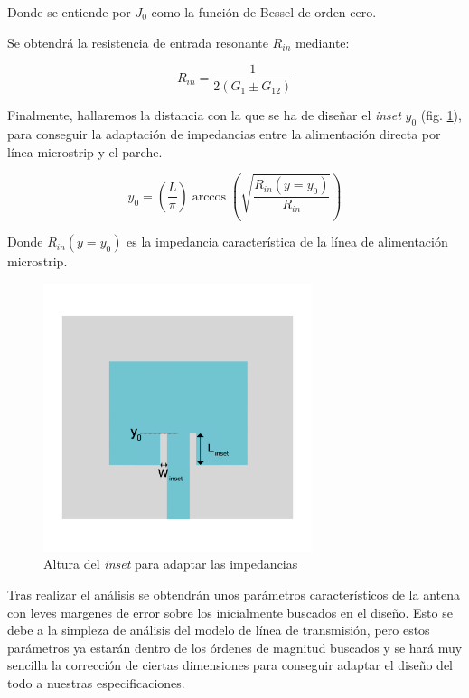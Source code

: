 Donde se entiende por \textit{$J_{0}$} como la función de Bessel de orden cero.
\\
\par Se obtendrá la resistencia de entrada resonante \textit{$R_{in}$} mediante:

\begin{equation}
	R_{in}=\frac{1}{2(G_{1}\pm G_{12})}
	\label{eq:rin}
\end{equation}

\par Finalmente, hallaremos la distancia con la que se ha de diseñar el  \textit{inset} \textit{$y_{0}$} (fig. \ref{fig:inset}),  para conseguir la adaptación de impedancias entre la alimentación directa por línea microstrip y el parche.

\begin{equation}
	y_{0}=\left ( \frac{L}{\pi} \right )\arccos\left ( \sqrt{\frac{R_{in}(y=y_{0})}{R_{in}}} \right )
	\label{eq:yo}
\end{equation}

Donde \textit{$R_{in}(y=y_{0})$} es la impedancia característica de la línea de alimentación microstrip.

\begin{figure}[h]
    \centering
        \includegraphics[width=0.7\textwidth]{archivos/parche/inset}
        \caption{Altura del \textit{inset} para adaptar las impedancias}
        \label{fig:inset}
\end{figure}

\par Tras realizar el análisis se obtendrán unos parámetros característicos de la antena con leves margenes de error sobre los inicialmente buscados en el diseño. Esto se debe a la simpleza de análisis del modelo de línea de transmisión, pero estos parámetros ya estarán dentro de los órdenes de magnitud buscados y se hará muy sencilla la corrección de ciertas dimensiones para conseguir adaptar el diseño del todo a nuestras especificaciones.

